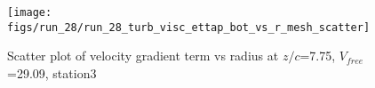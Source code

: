 \begin{figure}[H]
\centering
\texttt{[image: figs/run\_28/run\_28\_turb\_visc\_ettap\_bot\_vs\_r\_mesh\_scatter]}
\caption{Scatter plot of velocity gradient term vs radius at $z/c$=7.75, $V_{free}$=29.09, station3}
\label{fig:run_28_turb_visc_ettap_bot_vs_r_mesh_scatter}
\end{figure}


